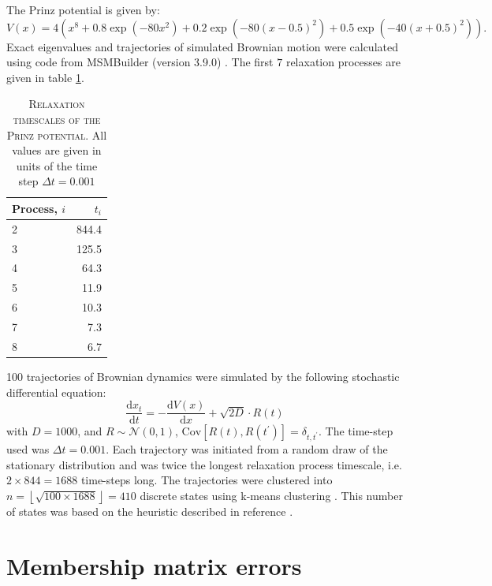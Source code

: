  The Prinz potential is given by: 
\begin{equation}\label{eqn:prinz_pot}
 V(x) = 4\left(x^8 + 0.8 \exp{\left(-80 x^2\right)} + 0.2 \exp{\left(-80 (x-0.5)^2\right)} + 0.5\exp{\left(-40 (x+0.5)^2\right)}\right).
\end{equation}
Exact eigenvalues and trajectories of simulated Brownian motion were calculated using code from MSMBuilder (version 3.9.0) \cite{beauchampMSMBuilder2ModelingConformational2011} . The first $7$ relaxation processes are given in table \ref{tab:prinz_its_exact}. 
\begin{table}
 \centering
 \begin{tabular}{lr}
 \toprule
 Process, $i$ & $t_i$ \\
 \midrule
  2 & 844.4 \\
  3 & 125.5 \\
  4 & 64.3 \\
  5 & 11.9 \\
  6 & 10.3 \\
  7 & 7.3 \\
  8 & 6.7 \\
  \bottomrule
 \end{tabular}
 \caption[Relaxation timescales of the Prinz potential]{\textsc{Relaxation timescales of the Prinz potential}. All values are given in units of the time step $\Delta t = 0.001$}
 \label{tab:prinz_its_exact}
\end{table}

\num{100} trajectories of Brownian dynamics were simulated by the following stochastic differential equation: 
\begin{equation}\label{eqn:prinz_dynamics}
 \frac{\mathrm{d}x_t}{\mathrm{d}t} = -\frac{\mathrm{d}V(x)}{\mathrm{d}x} + \sqrt{2D}\cdot R(t)
\end{equation}
with $D = 1000$, and $R\sim \mathcal{N}(0, 1)$, $\mathrm{Cov}\left[R(t), R(t^{\prime})\right]=\delta_{t, t^{\prime}}$. The time-step used was $\Delta t = 0.001$. Each trajectory was initiated from a random draw of the stationary distribution and was twice the longest relaxation process timescale, i.e. $2\times 844=1688$ time-steps long. The trajectories were clustered into $n = \left\lfloor\sqrt{100\times 1688}\right\rfloor =410$ discrete states using k-means clustering \cite{friedman2001elements}. This number of states was based on the heuristic described in reference \cite{husicWardClusteringImproves2017a}.

\section{Membership matrix errors}\label{sec:app_membership_errors}

